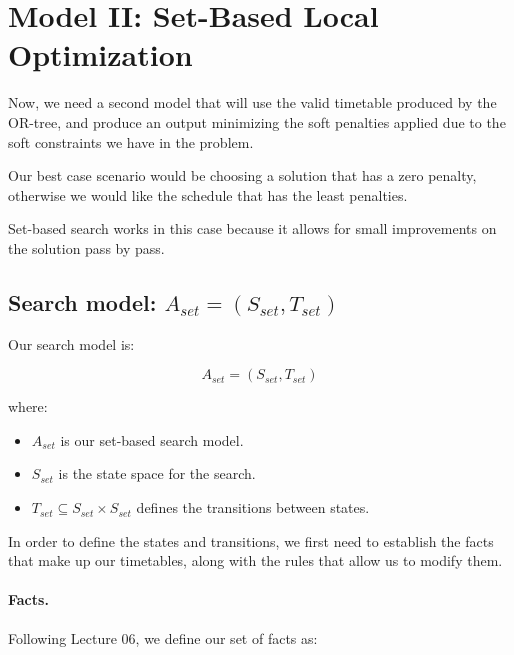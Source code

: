 
\section{Model II: Set-Based Local Optimization}

Now, we need a second model that will use the valid timetable produced by the OR-tree, and produce an output minimizing the soft penalties applied due to the soft constraints we have in the problem.

Our best case scenario would be choosing a solution that has a zero penalty, otherwise we would like the schedule that has the least penalties.

Set-based search works in this case because it allows for small improvements on the solution pass by pass.

\subsection{Search model: $A_{set}=(S_{set},T_{set})$}

Our search model is:

\begin{equation}
    A_{set}=(S_{set},T_{set})
\end{equation}

where:
\begin{itemize}
    \item $A_{set}$ is our set-based search model.
    \item $S_{set}$ is the state space for the search.
    \item $T_{set}\subseteq S_{set}\times S_{set}$ defines the transitions between states.
\end{itemize}

In order to define the states and transitions, we first need to establish the facts that make up our timetables, along with the rules that allow us to modify them.

\paragraph{Facts.}

Following Lecture 06, we define our set of facts as:

